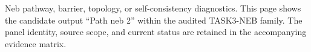Neb pathway, barrier, topology, or self-consistency diagnostics. This page shows the candidate output ``Path neb 2'' within the audited TASK3-NEB family. The panel identity, source scope, and current status are retained in the accompanying evidence matrix.
